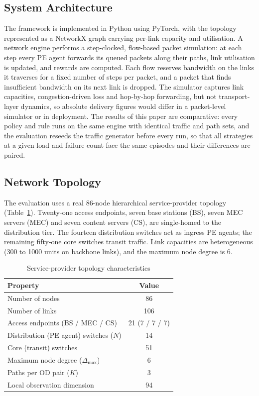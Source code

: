 \documentclass[10pt,journal,comsoc]{IEEEtran}
\begin{document}
\subsection{System Architecture}
The framework is implemented in Python using PyTorch, with the topology represented as a NetworkX graph carrying per-link capacity and utilisation. A network engine performs a step-clocked, flow-based packet simulation: at each step every PE agent forwards its queued packets along their paths, link utilisation is updated, and rewards are computed. Each flow reserves bandwidth on the links it traverses for a fixed number of steps per packet, and a packet that finds insufficient bandwidth on its next link is dropped. The simulator captures link capacities, congestion-driven loss and hop-by-hop forwarding, but not transport-layer dynamics, so absolute delivery figures would differ in a packet-level simulator or in deployment. The results of this paper are comparative: every policy and rule runs on the same engine with identical traffic and path sets, and the evaluation reseeds the traffic generator before every run, so that all strategies at a given load and failure count face the same episodes and their differences are paired.

\subsection{Network Topology}
The evaluation uses a real 86-node hierarchical service-provider topology (Table~\ref{tab:topology}). Twenty-one access endpoints, seven base stations (BS), seven MEC servers (MEC) and seven content servers (CS), are single-homed to the distribution tier. The fourteen distribution switches act as ingress PE agents; the remaining fifty-one core switches transit traffic. Link capacities are heterogeneous (300 to 1000 units on backbone links), and the maximum node degree is 6.

\begin{table}[!t]
  \centering
  \caption{Service-provider topology characteristics}
  \label{tab:topology}
  \begin{tabular}{lc}
    \toprule
    \textbf{Property} & \textbf{Value} \\
    \midrule
    Number of nodes & 86 \\
    Number of links & 106 \\
    Access endpoints (BS / MEC / CS) & 21 (7 / 7 / 7) \\
    Distribution (PE agent) switches ($N$) & 14 \\
    Core (transit) switches & 51 \\
    Maximum node degree ($\Delta_{\max}$) & 6 \\
    Paths per OD pair ($K$) & 3 \\
    Local observation dimension & 94 \\
    \bottomrule
  \end{tabular}
\end{table}
\end{document}
